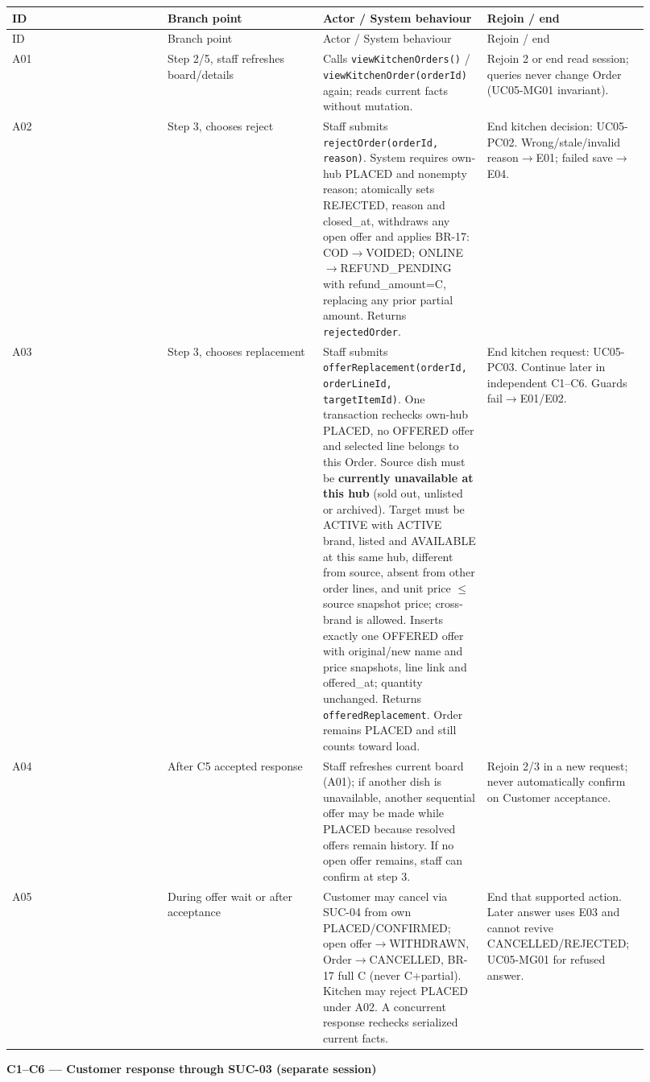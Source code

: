 \begin{longtable}{>{\raggedright\arraybackslash}p{0.2300\linewidth}>{\raggedright\arraybackslash}p{0.2300\linewidth}>{\raggedright\arraybackslash}p{0.2300\linewidth}>{\raggedright\arraybackslash}p{0.2300\linewidth}}
ID & Branch point & Actor / System behaviour & Rejoin / end \\
\hline\endfirsthead
ID & Branch point & Actor / System behaviour & Rejoin / end \\
\hline\endhead
A01 & Step 2/5, staff refreshes board/details & Calls \texttt{viewKitchenOrders()} / \texttt{viewKitchenOrder(orderId)} again; reads current facts without mutation. & Rejoin 2 or end read session; queries never change Order (UC05-MG01 invariant). \\
A02 & Step 3, chooses reject & Staff submits \texttt{rejectOrder(orderId, reason)}. System requires own-hub PLACED and nonempty reason; atomically sets REJECTED, reason and closed\_at, withdraws any open offer and applies BR-17: COD\ensuremath{\rightarrow}VOIDED; ONLINE\ensuremath{\rightarrow}REFUND\_PENDING with refund\_amount=C, replacing any prior partial amount. Returns \texttt{rejectedOrder}. & End kitchen decision: UC05-PC02. Wrong/stale/invalid reason\ensuremath{\rightarrow}E01; failed save\ensuremath{\rightarrow}E04. \\
A03 & Step 3, chooses replacement & Staff submits \texttt{offerReplacement(orderId, orderLineId, targetItemId)}. One transaction rechecks own-hub PLACED, no OFFERED offer and selected line belongs to this Order. Source dish must be \textbf{currently unavailable at this hub} (sold out, unlisted or archived). Target must be ACTIVE with ACTIVE brand, listed and AVAILABLE at this same hub, different from source, absent from other order lines, and unit price \ensuremath{\leq} source snapshot price; cross-brand is allowed. Inserts exactly one OFFERED offer with original/new name and price snapshots, line link and offered\_at; quantity unchanged. Returns \texttt{offeredReplacement}. Order remains PLACED and still counts toward load. & End kitchen request: UC05-PC03. Continue later in independent C1--C6. Guards fail\ensuremath{\rightarrow}E01/E02. \\
A04 & After C5 accepted response & Staff refreshes current board (A01); if another dish is unavailable, another sequential offer may be made while PLACED because resolved offers remain history. If no open offer remains, staff can confirm at step 3. & Rejoin 2/3 in a new request; never automatically confirm on Customer acceptance. \\
A05 & During offer wait or after acceptance & Customer may cancel via SUC-04 from own PLACED/CONFIRMED; open offer\ensuremath{\rightarrow}WITHDRAWN, Order\ensuremath{\rightarrow}CANCELLED, BR-17 full C (never C+partial). Kitchen may reject PLACED under A02. A concurrent response rechecks serialized current facts. & End that supported action. Later answer uses E03 and cannot revive CANCELLED/REJECTED; UC05-MG01 for refused answer. \\
\end{longtable}
\textbf{C1--C6 --- Customer response through SUC-03 (separate session)}

